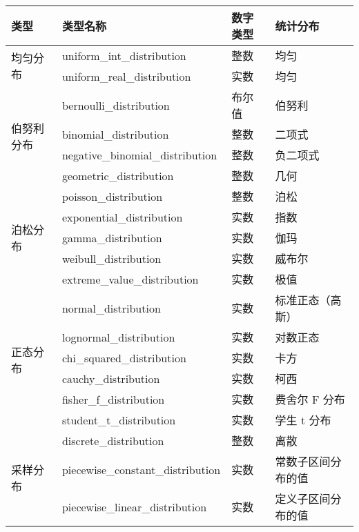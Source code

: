 \begin{longtable}{|l|l|l|l|}
\hline
\textbf{类型}           & \textbf{类型名称}               & \textbf{数字类型} & \textbf{统计分布}           \\ \hline
\endfirsthead
%
\endhead
%
\multirow{2}{*}{均匀分布}   & uniform\_int\_distribution       & 整数 & 均匀                  \\ \cline{2-4}
& uniform\_real\_distribution      & 实数    & 均匀                  \\ \hline
\multirow{4}{*}{伯努利分布} & bernoulli\_distribution          & 布尔值 & 伯努利                \\ \cline{2-4}
& binomial\_distribution           & 整数 & 二项式                 \\ \cline{2-4}
& negative\_binomial\_distribution & 整数 & 负二项式         \\ \cline{2-4}
& geometric\_distribution          & 整数 & 几何                \\ \hline
\multirow{5}{*}{泊松分布}   & poisson\_distribution            & 整数 & 泊松                  \\ \cline{2-4}
& exponential\_distribution        & 实数    & 指数              \\ \cline{2-4}
& gamma\_distribution              & 实数    & 伽玛                    \\ \cline{2-4}
& weibull\_distribution            & 实数    & 威布尔                  \\ \cline{2-4}
& extreme\_value\_distribution     & 实数    & 极值            \\ \hline
\multirow{6}{*}{正态分布} & normal\_distribution              & 实数             & 标准正态（高斯）                  \\ \cline{2-4}
& lognormal\_distribution          & 实数    & 对数正态                \\ \cline{2-4}
& chi\_squared\_distribution       & 实数    & 卡方              \\ \cline{2-4}
& cauchy\_distribution             & 实数    & 柯西                   \\ \cline{2-4}
& fisher\_f\_distribution          & 实数    & 费舍尔 F 分布  \\ \cline{2-4}
& student\_t\_distribution         & 实数    & 学生 t 分布 \\ \hline
\multirow{3}{*}{采样分布}  & discrete\_distribution           & 整数 & 离散                 \\ \cline{2-4}
& piecewise\_constant\_distribution & 实数             & 常数子区间分布的值 \\ \cline{2-4}
& piecewise\_linear\_distribution   & 实数             & 定义子区间分布的值  \\ \hline
\end{longtable}

